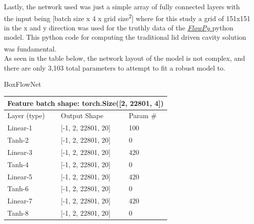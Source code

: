 \documentclass{article}
\begin{document}
     \noindent Lastly, the network used was just a simple array of fully connected layers with the input being [batch size x 4 x grid size\textsuperscript{2}] where for this study a grid of 151x151 in the x and y direction was used for the truthly data of the \textit{\underline{\href{https://github.com/gauravsdeshmukh/FlowPy}{FlowPy} }} python model. This python code for computing the traditional lid driven cavity solution was fundamental.\textsuperscript{\cite{Barba2019, FlowPy}} \\
    
     \noindent As seen in the table below, the network layout of the model is not complex, and there are only 3,103 total parameters to attempt to fit a robust model to. \\
    
	\centerline{BoxFlowNet} 
	\begin{table}[H]
		\centering 
		\begin{tabular}{lll}
			\hline
			\multicolumn{3}{|c|}{Feature batch shape: torch.Size({[}2, 22801, 4{]})}                                                   \\ \hline
			\multicolumn{1}{|l|}{Layer (type)}           & \multicolumn{1}{l|}{Output Shape}           & \multicolumn{1}{l|}{Param \#} \\ \hline
			\multicolumn{1}{|l|}{Linear-1}               & \multicolumn{1}{l|}{{[}-1, 2, 22801, 20{]}} & \multicolumn{1}{l|}{100}      \\ \hline
			\multicolumn{1}{|l|}{Tanh-2}                 & \multicolumn{1}{l|}{{[}-1, 2, 22801, 20{]}} & \multicolumn{1}{l|}{0}        \\ \hline
			\multicolumn{1}{|l|}{Linear-3}               & \multicolumn{1}{l|}{{[}-1, 2, 22801, 20{]}} & \multicolumn{1}{l|}{420}      \\ \hline
			\multicolumn{1}{|l|}{Tanh-4}                 & \multicolumn{1}{l|}{{[}-1, 2, 22801, 20{]}} & \multicolumn{1}{l|}{0}        \\ \hline
			\multicolumn{1}{|l|}{Linear-5}               & \multicolumn{1}{l|}{{[}-1, 2, 22801, 20{]}} & \multicolumn{1}{l|}{420}      \\ \hline
			\multicolumn{1}{|l|}{Tanh-6}                 & \multicolumn{1}{l|}{{[}-1, 2, 22801, 20{]}} & \multicolumn{1}{l|}{0}        \\ \hline
			\multicolumn{1}{|l|}{Linear-7}               & \multicolumn{1}{l|}{{[}-1, 2, 22801, 20{]}} & \multicolumn{1}{l|}{420}      \\ \hline
			\multicolumn{1}{|l|}{Tanh-8}                 & \multicolumn{1}{l|}{{[}-1, 2, 22801, 20{]}} & \multicolumn{1}{l|}{0}        \\ \hline

\end{tabular}
\end{table}
\end{document}
